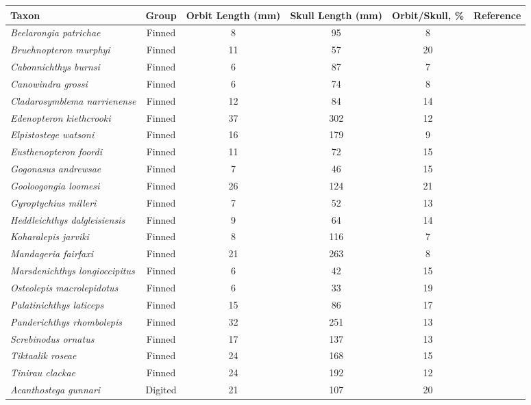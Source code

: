 \begin{tabular}{|L{4.5cm}|c|c|c|c|L{4.5cm}|}
\hline
\textbf{Taxon}&\textbf{Group}&\textbf{Orbit Length (mm)}&\textbf{Skull Length (mm)}&\textbf{Orbit/Skull, \%}&\textbf{Reference}\\\hline
\textit{Beelarongia patrichae}&Finned&8&95&8 &\cite{Long87a}\\\hline
\textit{Bruehnopteron  murphyi}&Finned&11&57&20&\cite{Schu12a}\\\hline
\textit{Cabonnichthys burnsi}&Finned&6&87&7 &\cite{Ahlb97a}\\\hline
\textit{Canowindra grossi}&Finned&6&74&8 &\cite{Long85a}\\\hline
\textit{Cladarosymblema narrienense}&Finned&12&84&14&\cite{Fox95a}\\\hline
\textit{Edenopteron kiethcrooki}&Finned&37&302&12&\cite{Youn13a}\\\hline
\textit{Elpistostege watsoni}&Finned&16&179&9 &\cite{Schu85a}\\\hline
\textit{Eusthenopteron foordi}&Finned&11&72&15&\cite{Mark07a}\\\hline
\textit{Gogonasus andrewsae}&Finned&7&46&15&\cite{Long06a}\\\hline
\textit{Gooloogongia loomesi}&Finned&26&124&21&\cite{Joha98a}\\\hline
\textit{Gyroptychius  milleri}&Finned&7&52&13&\cite{Newm15a}\\\hline
\textit{Heddleichthys dalgleisiensis}&Finned&9&64&14&\cite{Snit09a}\\\hline
\textit{Koharalepis jarviki}&Finned&8&116&7 &\cite{Youn92a}\\\hline
\textit{Mandageria fairfaxi}&Finned&21&263&8 &\cite{Joha97a}\\\hline
\textit{Marsdenichthys longioccipitus}&Finned&6&42&15&\cite{Holl10a}\\\hline
\textit{Osteolepis macrolepidotus}&Finned&6&33&19&\cite{Jarv48a}\\\hline
\textit{Palatinichthys laticeps}&Finned&15&86&17&\cite{Witz12a}\\\hline
\textit{Panderichthys rhombolepis}&Finned&32&251&13&\cite{Voro91a}\\\hline
\textit{Screbinodus ornatus}&Finned&17&137&13&\cite{Jeff12a}\\\hline
\textit{Tiktaalik roseae}&Finned&24&168&15&\cite{Daes06a}\\\hline
\textit{Tinirau clackae}&Finned&24&192&12&\cite{Swar12a}\\\hline
\textit{Acanthostega gunnari}&Digited&21&107&20&\cite{Clac02b,Porr15a}\\\hline

\end{tabular}
